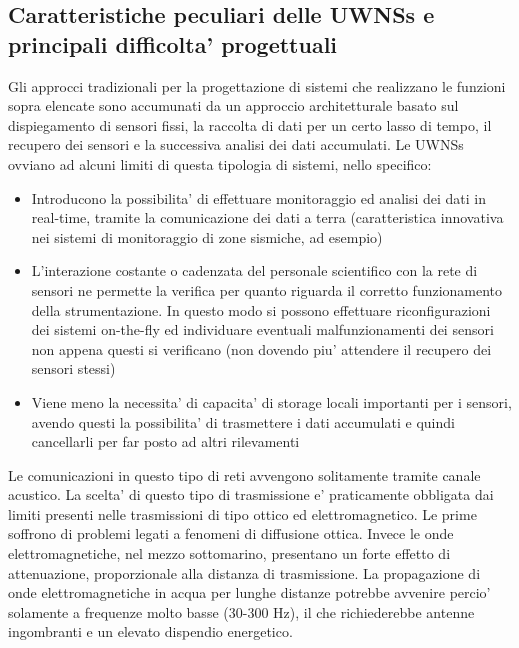 \subsection{Caratteristiche peculiari delle UWNSs e principali difficolta' progettuali}
Gli approcci tradizionali per la progettazione di sistemi che realizzano le funzioni sopra elencate sono accumunati da un approccio architetturale basato sul dispiegamento di sensori fissi, la raccolta di dati per un certo lasso di tempo, il recupero dei sensori e la successiva analisi dei dati accumulati.\newline
Le UWNSs ovviano ad alcuni limiti di questa tipologia di sistemi, nello specifico: \newline
\begin{itemize}
\item Introducono la possibilita' di effettuare monitoraggio ed analisi dei dati in real-time, tramite la comunicazione dei dati a terra (caratteristica innovativa nei sistemi di monitoraggio di zone sismiche, ad esempio)\newline
\item L'interazione costante o cadenzata del personale scientifico con la rete di sensori ne permette la verifica per quanto riguarda il corretto funzionamento della strumentazione. \newline In questo modo si possono effettuare riconfigurazioni dei sistemi on-the-fly ed individuare eventuali malfunzionamenti dei sensori non appena questi si verificano (non dovendo piu' attendere il recupero dei sensori stessi)\newline
\item Viene meno la necessita' di capacita' di storage locali importanti per i sensori, avendo questi la possibilita' di trasmettere i dati accumulati e quindi cancellarli per far posto ad altri rilevamenti
\end{itemize}
Le comunicazioni in questo tipo di reti avvengono solitamente tramite canale acustico. La scelta' di questo tipo di trasmissione e' praticamente obbligata dai limiti presenti nelle trasmissioni di tipo ottico ed elettromagnetico. Le prime soffrono di problemi legati a fenomeni di diffusione ottica.  Invece le onde elettromagnetiche, nel mezzo sottomarino, presentano un forte effetto di attenuazione, proporzionale alla distanza di trasmissione. La propagazione di onde elettromagnetiche in acqua per lunghe distanze potrebbe avvenire percio' solamente a frequenze molto basse (30-300 Hz), il che richiederebbe antenne ingombranti e un elevato dispendio energetico.

